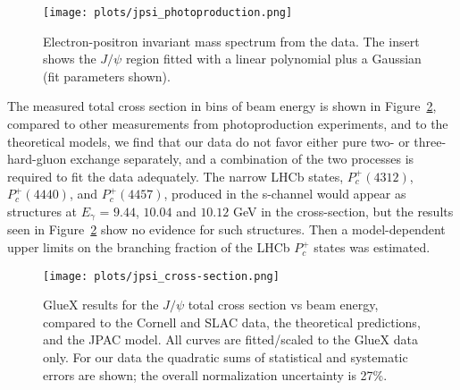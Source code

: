 \documentclass[a4paper]{jpconf}
\begin{document}
\begin{figure}[h]
    \centering
    \texttt{[image: plots/jpsi\_photoproduction.png]}
    \caption{\label{fig.5}Electron-positron invariant mass spectrum from the data. The insert shows the $J/\psi$ region fitted with a linear polynomial plus a Gaussian (fit parameters shown).}
\end{figure}

The measured total cross section in bins of beam energy is shown in Figure~\ref{fig.6}, compared to other measurements from photoproduction experiments, and to the theoretical models, we find that our data do not favor either pure two- or three-hard-gluon exchange separately, and a combination of the two processes is required to fit the data adequately.
The narrow LHCb states, $P^{+}_{c}(4312)$, $P^{+}_{c}(4440)$, and $P^{+}_{c}(4457)$, produced in the s-channel would appear as structures at $E_{\gamma}$ = $9.44$, $10.04$ and $10.12$ GeV in the cross-section, but the results seen in Figure~\ref{fig.6} show no evidence for such structures. Then a model-dependent upper limits on the branching fraction of the LHCb $P^{+}_{c}$ states was estimated.

\begin{figure}[h]
    \centering
    \texttt{[image: plots/jpsi\_cross-section.png]}
    \caption{\label{fig.6}GlueX results for the $J/\psi$ total cross section vs beam energy, compared to the Cornell and SLAC data, the theoretical predictions, and the JPAC model. All curves are fitted/scaled to the GlueX data only. For our data the quadratic sums of statistical and systematic errors are shown; the overall normalization uncertainty is 27\%.}
\end{figure}
\end{document}
